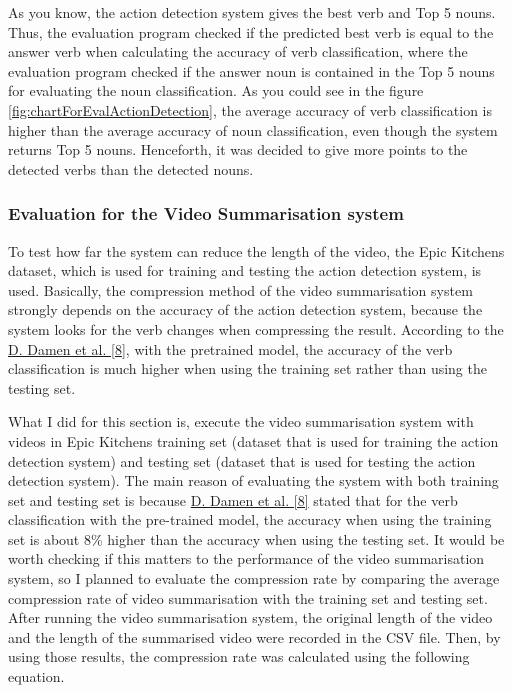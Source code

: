 \documentclass{article}
\begin{document}
As you know, the action detection system gives the best verb and Top 5 nouns. Thus, the evaluation program checked if the predicted best verb is equal to the answer verb when calculating the accuracy of verb classification, where the evaluation program checked if the answer noun is contained in the Top 5 nouns for evaluating the noun classification. As you could see in the figure \ref{fig:chartForEvalActionDetection}, the average accuracy of verb classification is higher than the average accuracy of noun classification, even though the system returns Top 5 nouns. Henceforth, it was decided to give more points to the detected verbs than the detected nouns.

\subsubsection{Evaluation for the Video Summarisation system}

To test how far the system can reduce the length of the video, the Epic Kitchens dataset, which is used for training and testing the action detection system, is used. Basically, the compression method of the video summarisation system strongly depends on the accuracy of the action detection system, because the system looks for the verb changes when compressing the result. According to the \hyperlink{ref8}{D. Damen et al. [8]}, with the pretrained model, the accuracy of the verb classification is much higher when using the training set rather than using the testing set.

What I did for this section is, execute the video summarisation system with videos in Epic Kitchens training set (dataset that is used for training the action detection system) and testing set (dataset that is used for testing the action detection system). The main reason of evaluating the system with both training set and testing set is because \hyperlink{ref8}{D. Damen et al. [8]} stated that for the verb classification with the pre-trained model, the accuracy when using the training set is about 8\% higher than the accuracy when using the testing set. It would be worth checking if this matters to the performance of the video summarisation system, so I planned to evaluate the compression rate by comparing the average compression rate of video summarisation with the training set and testing set. After running the video summarisation system, the original length of the video and the length of the summarised video were recorded in the CSV file. Then, by using those results, the compression rate was calculated using the following equation.
\end{document}
